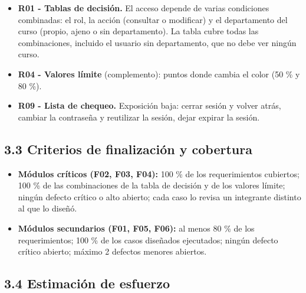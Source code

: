 \documentclass[11pt,a4paper,oneside]{report}
\begin{document}
\begin{itemize}
\item \textbf{R01 - Tablas de decisión.} El acceso depende de varias condiciones combinadas: el rol, la acción (consultar o modificar) y el departamento del curso (propio, ajeno o sin departamento). La tabla cubre todas las combinaciones, incluido el usuario sin departamento, que no debe ver ningún curso.
\item \textbf{R04 - Valores límite} (complemento): puntos donde cambia el color (50 \% y 80 \%).
\item \textbf{R09 - Lista de chequeo.} Exposición baja: cerrar sesión y volver atrás, cambiar la contraseña y reutilizar la sesión, dejar expirar la sesión.
\end{itemize}

\subsection*{3.3 Criterios de finalización y cobertura}

\begin{itemize}
\item \textbf{Módulos críticos (F02, F03, F04):} 100 \% de los requerimientos cubiertos; 100 \% de las combinaciones de la tabla de decisión y de los valores límite; ningún defecto crítico o alto abierto; cada caso lo revisa un integrante distinto al que lo diseñó.
\item \textbf{Módulos secundarios (F01, F05, F06):} al menos 80 \% de los requerimientos; 100 \% de los casos diseñados ejecutados; ningún defecto crítico abierto; máximo 2 defectos menores abiertos.
\end{itemize}

\Needspace{150pt}\subsection*{3.4 Estimación de esfuerzo}

\par{}
\end{document}
